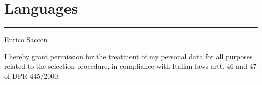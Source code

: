\documentclass[10pt,a4paper,sans]{moderncv} %
\begin{document}
\section{Languages}


\vspace*{\fill}
    \begin{flushright}
      \begin{minipage}{.4\paperwidth}
        \centering
        \noindent\rule{.4\paperwidth}{0.4pt}
        \vspace{1em}
        Enrico Saccon
      \end{minipage}
    \end{flushright}




    \noindent\makebox[\linewidth]{\rule{.9\paperwidth}{0.4pt}}
    {\center\footnotesize
        I hereby grant permission for the treatment of my personal data for all purposes related to the selection procedure, in compliance with Italian laws artt. 46 and 47 of DPR 445/2000.
    }

\lfoot{\today}
\thispagestyle{fancy}
\end{document}
